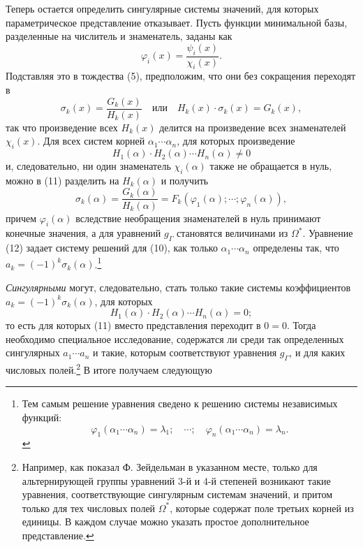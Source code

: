 \documentclass[11pt]{article}
\begin{document}
Теперь остается определить сингулярные системы значений, для которых параметрическое представление отказывает. Пусть функции минимальной базы, разделенные на числитель и знаменатель, заданы как
\[
\varphi_i(x)=\frac{\psi_i(x)}{\chi_i(x)}.
\]
Подставляя это в тождества (5), предположим, что они без сокращения переходят в
\begin{equation}
\sigma_k(x)=\frac{G_k(x)}{H_k(x)}\quad\text{или}\quad H_k(x)\cdot\sigma_k(x)=G_k(x),
\tag{11}
\end{equation}
так что произведение всех $H_k(x)$ делится на произведение всех знаменателей $\chi_i(x)$. Для всех систем корней $\alpha_1\cdots\alpha_n$, для которых произведение
\[
H_1(\alpha)\cdot H_2(\alpha)\cdots H_n(\alpha)\neq0
\]
и, следовательно, ни один знаменатель $\chi_i(\alpha)$ также не обращается в нуль, можно в (11) разделить на $H_k(\alpha)$ и получить
\begin{equation}
\sigma_k(\alpha)=\frac{G_k(\alpha)}{H_k(\alpha)}=F_k(\varphi_1(\alpha);\cdots;\varphi_n(\alpha)),
\tag{12}
\end{equation}
причем $\varphi_i(\alpha)$ вследствие необращения знаменателей в нуль принимают конечные значения, а для уравнений $g_\Gamma$ становятся величинами из $\Omega^*$. Уравнение (12) задает систему решений для (10), как только $\alpha_1\cdots\alpha_n$ определены так, что $a_k=(-1)^k\sigma_k(\alpha)$.\footnote{Тем самым решение уравнения сведено к решению системы независимых функций:
\[
\varphi_1(\alpha_1\cdots\alpha_n)=\lambda_1;\quad \cdots;\quad \varphi_n(\alpha_1\cdots\alpha_n)=\lambda_n.
\]}

\emph{Сингулярными} могут, следовательно, стать только такие системы коэффициентов $a_k=(-1)^k\sigma_k(\alpha)$, для которых
\[
H_1(\alpha)\cdot H_2(\alpha)\cdots H_n(\alpha)=0;
\]
то есть для которых (11) вместо представления переходит в $0=0$. Тогда необходимо специальное исследование, содержатся ли среди так определенных сингулярных $a_1\cdots a_n$ и такие, которым соответствуют уравнения $g_\Gamma$, и для каких числовых полей.\footnote{Например, как показал Ф. Зейдельман в указанном месте, только для альтернирующей группы уравнений 3-й и 4-й степеней возникают такие уравнения, соответствующие сингулярным системам значений, и притом только для тех числовых полей $\Omega^*$, которые содержат поле третьих корней из единицы. В каждом случае можно указать простое дополнительное представление.} В итоге получаем следующую
\end{document}
